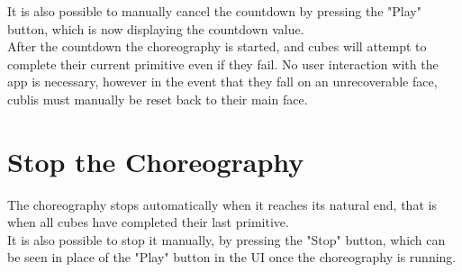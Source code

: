 It is also possible to manually cancel the countdown by pressing the "Play" button, which is now displaying the countdown value.\\

After the countdown the choreography is started, and cubes will attempt to complete their current primitive even if they fail. No user interaction with the app is necessary, however in the event that they fall on an unrecoverable face, cublis must manually be reset back to their main face.


\section{Stop the Choreography}

The choreography stops automatically when it reaches its natural end, that is when all cubes have completed their last primitive. \\

It is also possible to stop it manually, by pressing the "Stop" button, which can be seen in place of the "Play" button in the UI once the choreography is running.

